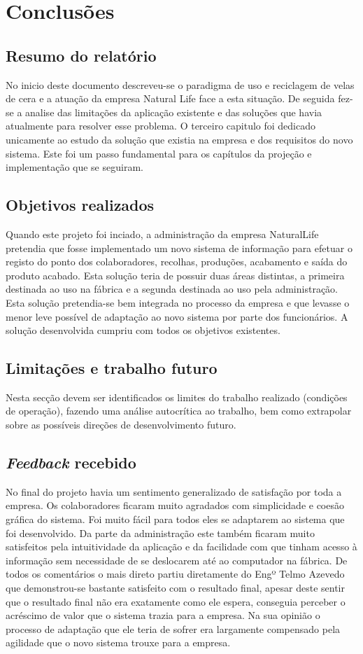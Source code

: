 \chapter{Conclusões}
\label{cap:6}
\section{Resumo do relatório}
No inicio deste documento descreveu-se o paradigma de uso e reciclagem de velas de cera e a atuação da empresa Natural Life face a esta situação. De seguida fez-se a analise das limitações da aplicação existente e das soluções que havia atualmente para resolver esse problema. O terceiro capitulo foi dedicado unicamente ao estudo da solução que existia na empresa e dos requisitos do novo sistema. Este foi um passo fundamental para os capítulos da projeção e implementação que se seguiram.


\section{Objetivos realizados}
Quando este projeto foi inciado, a administração da empresa NaturalLife pretendia que fosse implementado um novo sistema de informação para efetuar o registo do ponto dos colaboradores, recolhas, produções, acabamento e saída do produto acabado. Esta solução teria de possuir duas áreas distintas, a primeira destinada ao uso na fábrica e a segunda destinada ao uso pela administração. Esta solução pretendia-se bem integrada no processo da empresa e que levasse o menor leve possível de adaptação ao novo sistema por parte dos funcionários. A solução desenvolvida cumpriu com todos os objetivos existentes.

\section{Limitações e trabalho futuro}
Nesta secção devem ser identificados os limites do trabalho realizado (condições de operação), fazendo uma análise autocrítica ao trabalho, bem como extrapolar sobre as possíveis direções de desenvolvimento futuro.

\section{\textit{Feedback} recebido}
No final do projeto havia um sentimento generalizado de satisfação por toda a empresa. Os colaboradores ficaram muito agradados com simplicidade e coesão gráfica do sistema. Foi muito fácil para todos eles se adaptarem ao sistema que foi desenvolvido. Da parte da administração este também ficaram muito satisfeitos pela intuitividade da aplicação e da facilidade com que tinham acesso à informação sem necessidade de se deslocarem até ao computador na fábrica. De todos os comentários o mais direto partiu diretamente do Engº Telmo Azevedo que demonstrou-se bastante satisfeito com o resultado final, apesar deste sentir que o resultado final não era exatamente como ele espera, conseguia perceber o acréscimo de valor que o sistema trazia para a empresa. Na sua opinião o processo de adaptação que ele teria de sofrer era largamente compensado pela agilidade que o novo sistema trouxe para a empresa.

